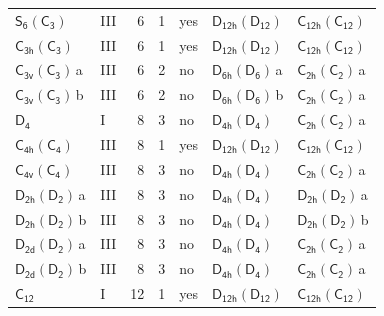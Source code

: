 \documentclass[10pt,a4paper]{article}
\numberwithin{equation}{section}
\newcommand{\grp}[1]{\mathsf{#1}}
\newcommand{\clsletter}[1]{\,{\scriptsize\color{black!55}#1}}
\begin{document}
{\begin{longtable}{@{}llrrlll@{}}
\href{S6-C3.pdf}{$\grp{S_{6}}(\grp{C_{3}})$} & III & 6 & 1 & yes & \href{D12h-D12.pdf}{$\grp{D_{12h}}(\grp{D_{12}})$} & \href{C12h-C12.pdf}{$\grp{C_{12h}}(\grp{C_{12}})$}\\
\href{C3h-C3.pdf}{$\grp{C_{3h}}(\grp{C_{3}})$} & III & 6 & 1 & yes & \href{D12h-D12.pdf}{$\grp{D_{12h}}(\grp{D_{12}})$} & \href{C12h-C12.pdf}{$\grp{C_{12h}}(\grp{C_{12}})$}\\
\href{C3v-C3.pdf}{$\grp{C_{3v}}(\grp{C_{3}})$}\clsletter{a} & III & 6 & 2 & no & \href{D6h-D6.pdf}{$\grp{D_{6h}}(\grp{D_{6}})$}\clsletter{a} & \href{C2h-C2.pdf}{$\grp{C_{2h}}(\grp{C_{2}})$}\clsletter{a}\\
\href{C3v-C3.pdf}{$\grp{C_{3v}}(\grp{C_{3}})$}\clsletter{b} & III & 6 & 2 & no & \href{D6h-D6.pdf}{$\grp{D_{6h}}(\grp{D_{6}})$}\clsletter{b} & \href{C2h-C2.pdf}{$\grp{C_{2h}}(\grp{C_{2}})$}\clsletter{a}\\
\href{../../../rotation/data/pdf/D4.pdf}{$\grp{D_{4}}$} & I & 8 & 3 & no & \href{D4h-D4.pdf}{$\grp{D_{4h}}(\grp{D_{4}})$} & \href{C2h-C2.pdf}{$\grp{C_{2h}}(\grp{C_{2}})$}\clsletter{a}\\
\href{C4h-C4.pdf}{$\grp{C_{4h}}(\grp{C_{4}})$} & III & 8 & 1 & yes & \href{D12h-D12.pdf}{$\grp{D_{12h}}(\grp{D_{12}})$} & \href{C12h-C12.pdf}{$\grp{C_{12h}}(\grp{C_{12}})$}\\
\href{C4v-C4.pdf}{$\grp{C_{4v}}(\grp{C_{4}})$} & III & 8 & 3 & no & \href{D4h-D4.pdf}{$\grp{D_{4h}}(\grp{D_{4}})$} & \href{C2h-C2.pdf}{$\grp{C_{2h}}(\grp{C_{2}})$}\clsletter{a}\\
\href{D2h-D2.pdf}{$\grp{D_{2h}}(\grp{D_{2}})$}\clsletter{a} & III & 8 & 3 & no & \href{D4h-D4.pdf}{$\grp{D_{4h}}(\grp{D_{4}})$} & \href{D2h-D2.pdf}{$\grp{D_{2h}}(\grp{D_{2}})$}\clsletter{a}\\
\href{D2h-D2.pdf}{$\grp{D_{2h}}(\grp{D_{2}})$}\clsletter{b} & III & 8 & 3 & no & \href{D4h-D4.pdf}{$\grp{D_{4h}}(\grp{D_{4}})$} & \href{D2h-D2.pdf}{$\grp{D_{2h}}(\grp{D_{2}})$}\clsletter{b}\\
\href{D2d-D2.pdf}{$\grp{D_{2d}}(\grp{D_{2}})$}\clsletter{a} & III & 8 & 3 & no & \href{D4h-D4.pdf}{$\grp{D_{4h}}(\grp{D_{4}})$} & \href{C2h-C2.pdf}{$\grp{C_{2h}}(\grp{C_{2}})$}\clsletter{a}\\
\href{D2d-D2.pdf}{$\grp{D_{2d}}(\grp{D_{2}})$}\clsletter{b} & III & 8 & 3 & no & \href{D4h-D4.pdf}{$\grp{D_{4h}}(\grp{D_{4}})$} & \href{C2h-C2.pdf}{$\grp{C_{2h}}(\grp{C_{2}})$}\clsletter{a}\\
\href{../../../rotation/data/pdf/C12.pdf}{$\grp{C_{12}}$} & I & 12 & 1 & yes & \href{D12h-D12.pdf}{$\grp{D_{12h}}(\grp{D_{12}})$} & \href{C12h-C12.pdf}{$\grp{C_{12h}}(\grp{C_{12}})$}\\

\end{longtable}}
\end{document}
